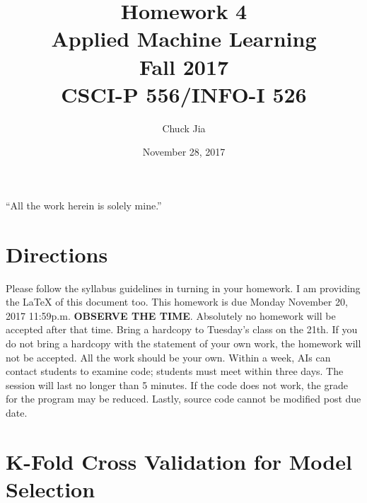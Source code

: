 \documentclass{article}
\newcommand{\quotes}[1]{``#1''}
\begin{document}
\title{Homework 4\\ Applied Machine Learning \\ Fall 2017\\ CSCI-P 556/INFO-I 526}         %
\author{Chuck Jia}        %
\date{November 28, 2017}          %
\maketitle
\quotes{All the work herein is solely mine.}
\makeatother     %
\pagestyle{plain}
\section*{Directions}
Please follow the syllabus guidelines in turning in your homework.  I am providing the \LaTeX{} of this document too. This homework is due Monday November 20, 2017 11:59p.m. \textbf{OBSERVE THE  TIME}. Absolutely
no homework will be accepted after that time. Bring a hardcopy to Tuesday’s class on the 21th.
If you do not bring a hardcopy with the statement of your own work, the homework will not be
accepted. All the work should be your own.  Within a week, AIs can contact students to examine code; students must meet within three days.  The session will last no longer than 5 minutes.  If the code does not work, the grade for the program may be reduced.  Lastly, source code cannot be
 modified post due date.
 
 
 
  
\section*{K-Fold Cross Validation for Model Selection }
\end{document}

